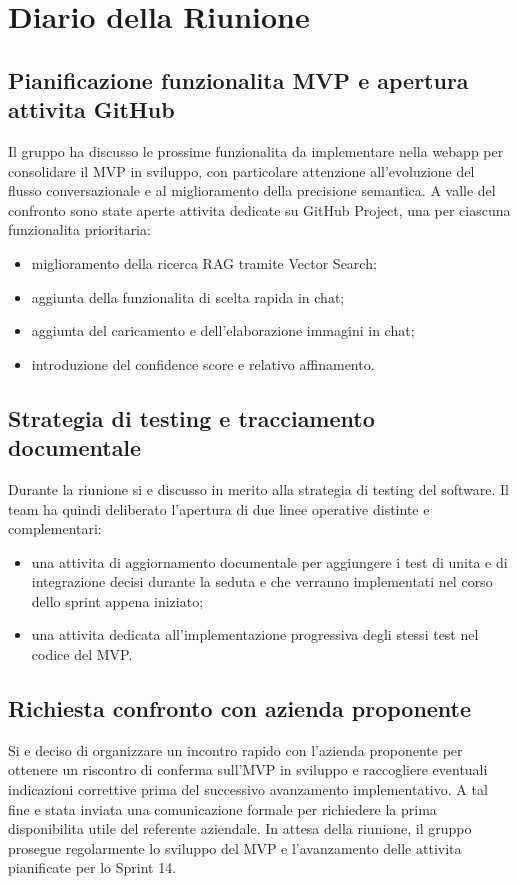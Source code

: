 \documentclass[a4paper, 11pt, oneside]{scrartcl} %
\begin{document}
\newpage
\section{Diario della Riunione}

\subsection{Pianificazione funzionalita MVP e apertura attivita GitHub}
Il gruppo ha discusso le prossime funzionalita da implementare nella webapp per consolidare il MVP in sviluppo, con particolare attenzione all'evoluzione del flusso conversazionale e al miglioramento della precisione semantica.
A valle del confronto sono state aperte attivita dedicate su GitHub Project, una per ciascuna funzionalita prioritaria:
\begin{itemize}[noitemsep, topsep=2pt]
    \item miglioramento della ricerca RAG tramite Vector Search;
    \item aggiunta della funzionalita di scelta rapida in chat;
    \item aggiunta del caricamento e dell'elaborazione immagini in chat;
    \item introduzione del confidence score e relativo affinamento.
\end{itemize}

\subsection{Strategia di testing e tracciamento documentale}
Durante la riunione si e discusso in merito alla strategia di testing del software.
Il team ha quindi deliberato l'apertura di due linee operative distinte e complementari:
\begin{itemize}[noitemsep, topsep=2pt]
    \item una attivita di aggiornamento documentale per aggiungere i test di unita e di integrazione decisi durante la seduta e che verranno implementati nel corso dello sprint appena iniziato;
    \item una attivita dedicata all'implementazione progressiva degli stessi test nel codice del MVP.
\end{itemize}

\subsection{Richiesta confronto con azienda proponente}
Si e deciso di organizzare un incontro rapido con l'azienda proponente per ottenere un riscontro di conferma sull'MVP in sviluppo e raccogliere eventuali indicazioni correttive prima del successivo avanzamento implementativo.
A tal fine e stata inviata una comunicazione formale per richiedere la prima disponibilita utile del referente aziendale.
In attesa della riunione, il gruppo prosegue regolarmente lo sviluppo del MVP e l'avanzamento delle attivita pianificate per lo Sprint 14.
\end{document}
